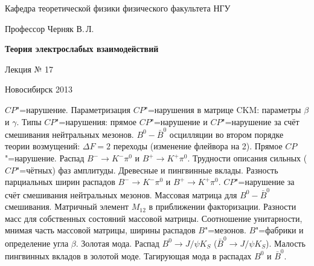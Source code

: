 \documentclass[12pt,pagesize,paper=192mm:108mm]{scrbook}
\begin{document}
\begin{titlepage}
\begin{center}
    Кафедра теоретической физики физического факультета НГУ
    \medskip

    \Large
    Профессор Черняк В.\,Л.
    \bigskip

    \huge
    \textbf{Теория электрослабых взаимодействий}
    \bigskip

    \Large
    Лекция № 17
    \vfill

    \vfill

\normalsize    Новосибирск 2013
  \smallskip

  \ccbysa
  \end{center}
\end{titlepage}
\newpage

\vspace*{-1em}
\begin{center}
 \vfill
  \begin{minipage}{0.66\linewidth}
    $CP$"=нарушение. Параметризация $CP$"=нарушения в матрице CKM:
    параметры $\beta$ и $\gamma$.  Типы $CP$"=нарушения: прямое
    $CP$"=нарушение и $CP$"=нарушение за счёт смешивания нейтральных
    мезонов.  $B^0-\bar{B}^0$ осцилляции во втором порядке теории
    возмущений: $\Delta F = 2$ переходы (изменение флейвора на
    2). Прямое $CP$"=нарушение. Распад $B^-\to K^-\pi^0$ и $B^+\to
    K^+\pi^0$.  Трудности описания сильных ($CP$"=чётных) фаз
    амплитуды. Древесные и пингвинные вклады. Разность парциальных
    ширин распадов $B^-\to K^-\pi^0$ и $B^+\to K^+\pi^0$.
    $CP$"=нарушение за счёт смешивания нейтральных мезонов. Массовая
    матрица для $B^0-\bar{B}^0$ смешивания.  Матричный элемент
    $M_{12}$ в приближении факторизации. Разности масс для собственных
    состояний массовой матрицы.  Соотношение унитарности, мнимая часть
    массовой матрицы, ширины распадов $B$"=мезонов. $B$"=фабрики и
    определение угла $\beta$. Золотая мода.  Распад $B^0\to J/\psi
    K_S$ ($\bar{B}^0\to J/\psi K_S$).  Малость пингвинных вкладов в
    золотой моде. Тагирующая мода в распадах $B^0$ и $\bar{B}^0$.
  \end{minipage}
  \vfill

\end{center}
\end{document}
